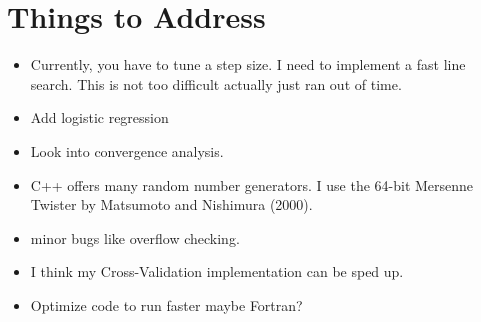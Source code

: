 \documentclass[10pt, reqno]{article}
\numberwithin{equation}{section}
\begin{document}
\newpage
\section*{Things to Address}

\begin{itemize}

\item Currently, you have to tune a step size. I need to implement a fast line search. This is not too difficult actually just ran out of time.

\item Add logistic regression

\item Look into convergence analysis.

\item C++ offers many random number generators. I use the 64-bit Mersenne Twister by Matsumoto and Nishimura (2000).

\item minor bugs like overflow checking.

\item I think my Cross-Validation implementation can be sped up.

\item Optimize code to run faster maybe Fortran?

\end{itemize}
\end{document}
